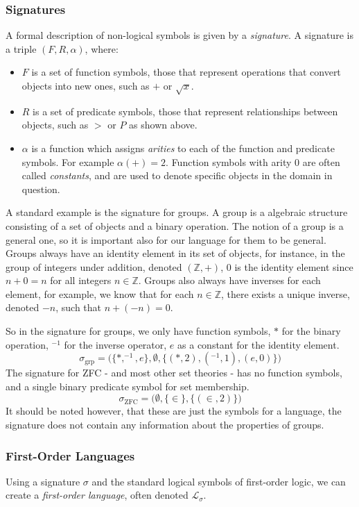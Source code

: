\documentclass[12pt]{article}
\theoremstyle{definition}
\begin{document}
\subsubsection{Signatures}
A formal description of non-logical symbols is
given by a \emph{signature}. A signature is a triple $(F,R,\alpha)$, where:
\begin{itemize}
\item $F$ is a set of function symbols, those that represent operations that convert objects into new ones, such as $+$ or $\sqrt{x}$.
\item $R$ is a set of predicate symbols, those that represent relationships between objects, such as $>$ or $P$ as shown above.
\item $\alpha$ is a function which assigns \emph{arities} to each of the function and predicate symbols.
For example $\alpha(+) = 2$. Function symbols with arity $0$ are often called \emph{constants}, and are used to denote specific objects in the domain in question.
\end{itemize}
A standard example is the signature for groups.
A group is a algebraic structure consisting of a set of objects and a binary operation.
The notion of a group is a general one, so it is important also for our language for them to be general.
Groups always have an identity element in its set of objects, for instance, in the group of integers under addition, denoted $(\mathbb{Z}, +)$, $0$ is the identity element since $n + 0 = n$ for all integers $n\in\mathbb{Z}$.
Groups also always have inverses for each element, for example, we know that for each $n\in\mathbb{Z}$, there exists a unique inverse, denoted $-n$, such that $n + (-n) = 0$.

So in the signature for groups, we only have function symbols, $*$ for the binary operation, $^{-1}$ for the inverse operator, $e$ as a constant for the identity element.
$$\sigma_{\text{grp}} = \big(\{*,^{-1}, e\},\emptyset,\{(*, 2), (^{-1}, 1),(e,0)\}\big)$$
The signature for ZFC - and most other set theories - has no function symbols, and a single binary predicate symbol for set membership.
$$\sigma_{\text{ZFC}} = \big(\emptyset,\{\in\},\{(\in, 2)\})$$
It should be noted however, that these are just the symbols for a language, the signature does not contain any information about the properties of groups.

\subsubsection{First-Order Languages}
Using a signature $\sigma$ and the standard logical symbols of first-order logic, we can create a \emph{first-order language}, often denoted $\mathcal{L}_\sigma$.
\end{document}

